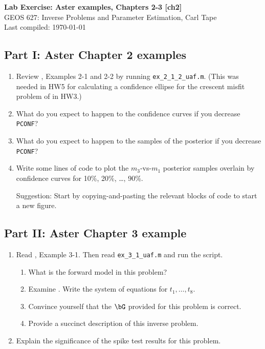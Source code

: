 \documentclass[11pt,titlepage,fleqn]{article}
\begin{document}

\begin{spacing}{1.2}
\centering
{\large \bf Lab Exercise: Aster examples, Chapters 2-3 [ch2]} \\
GEOS 627: Inverse Problems and Parameter Estimation, Carl Tape \\
Last compiled: \today \\
\end{spacing}

\subsection*{Part I: Aster Chapter 2 examples}

\begin{enumerate}
\item Review \citet{Aster}, Examples 2-1 and 2-2 by running \verb+ex_2_1_2_uaf.m+.
(This was needed in HW5 for calculating a confidence ellipse for the crescent misfit problem of \citet{Tarantola2005} in HW3.)

\item What do you expect to happen to the confidence curves if you decrease \verb+PCONF+?

\item What do you expect to happen to the samples of the posterior if you decrease \verb+PCONF+?

\item Write some lines of code to plot the $m_3$-vs-$m_1$ posterior samples overlain by confidence curves for 10\%, 20\%, \ldots, 90\%.

Suggestion: Start by copying-and-pasting the relevant blocks of code to start a new figure.

\end{enumerate}


\subsection*{Part II: Aster Chapter 3 example}

\begin{enumerate}
\item Read \citet{Aster}, Example 3-1. Then read \verb+ex_3_1_uaf.m+ and run the script. 
%
\begin{enumerate}
\item What is the forward model in this problem?
\item Examine . Write the system of equations for $t_1, \ldots, t_8$.
\item Convince yourself that the $\bG$ provided for this problem is correct.
\item Provide a succinct description of this inverse problem.
\end{enumerate}

\item Explain the significance of the spike test results for this problem.

\end{enumerate}
\end{document}
